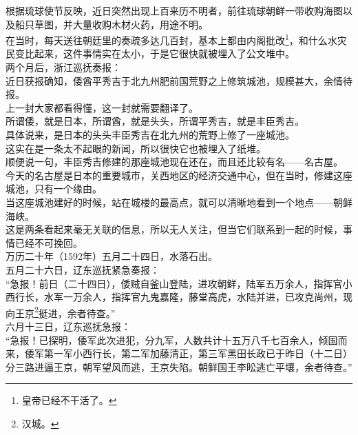 \begin{multicols}{\theparacolNo}
根据琉球使节反映，近日突然出现上百来历不明者，前往琉球朝鲜一带收购海图以及船只草图，并大量收购木材火药，用途不明。\\

在当时，每天送往朝廷里的奏疏多达几百封，基本上都由内阁批改\footnote{皇帝已经不干活了。}，和什么水灾民变比起来，这件事情实在太小，于是它很快就被埋入了公文堆中。\\

两个月后，浙江巡抚奏报：\\

近日获报确知，倭酋平秀吉于北九州肥前国荒野之上修筑城池，规模甚大，余情待报。\\

上一封大家都看得懂，这一封就需要翻译了。\\

所谓倭，就是日本，所谓酋，就是头头，所谓平秀吉，就是丰臣秀吉。\\

具体说来，是日本的头头丰臣秀吉在北九州的荒野上修了一座城池。\\

这实在是一条太不起眼的新闻，所以很快它也被埋入了纸堆。\\

顺便说一句，丰臣秀吉修建的那座城池现在还在，而且还比较有名——名古屋。\\

今天的名古屋是日本的重要城市，关西地区的经济交通中心，但在当时，修建这座城池，只有一个缘由。\\

当这座城池建好的时候，站在城楼的最高点，就可以清晰地看到一个地点——朝鲜海峡。\\

这是两条看起来毫无关联的信息，所以无人关注，但当它们联系到一起的时候，事情已经不可挽回。\\

万历二十年（1592年）五月二十四日，水落石出。\\

五月二十六日，辽东巡抚紧急奏报：\\

“急报！前日（二十四日），倭贼自釜山登陆，进攻朝鲜，陆军五万余人，指挥官小西行长，水军一万余人，指挥官九鬼嘉隆，藤堂高虎，水陆并进，已攻克尚州，现向王京\footnote{汉城。}挺进，余者待查。”\\

六月十三日，辽东巡抚急报：\\

“急报！已探明，倭军此次进犯，分九军，人数共计十五万八千七百余人，倾国而来，倭军第一军小西行长，第二军加藤清正，第三军黑田长政已于昨日（十二日）分三路进逼王京，朝军望风而逃，王京失陷。朝鲜国王李昖逃亡平壤，余者待查。”\\


\end{multicols}
